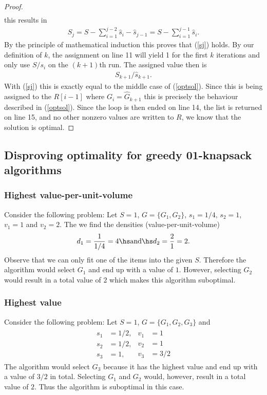 \documentclass{article}
\begin{document}
\begin{proof}
\begin{align*}
	\end{align*}
	this results in
	\begin{align*}
		S_j = S - \sum_{i=1}^{j-2} \hat s_i - \hat s_{j-1} = S - \sum_{i=1}^{j-1} \hat s_i.
	\end{align*}
	By the principle of mathematical induction this proves that (\ref{sj}) holds.
	By our definition of $k$, the assignment on line 11 will yield 1 for the first $k$
	iterations and only use $S/s_i$ on the $(k+1)$th run. The assigned value then is
	\begin{align*}
		S_{k+1}/\hat s_{k+1}.
	\end{align*}
	With (\ref{sj}) this is exactly equal to the middle case of (\ref{optsol}).
	Since this is being assigned to the $R[i-1]$ where $G_i = \hat G_{k+1}$ this
	is precisely the behaviour described in (\ref{optsol}).
	Since the loop is then ended on line 14, the list is returned on line 15,
	and no other nonzero values are written to $R$,
	we know that the solution is optimal.
\end{proof}

\subsection{Disproving optimality for greedy 01-knapsack algorithms}

\subsubsection{Highest value-per-unit-volume}

Consider the following problem: Let $S=1$, $G=\{G_1, G_2\}$, $s_1=1/4$, $s_2=1$,
$v_1=1$ and $v_2=2$. The we find the densities (value-per-unit-volume)
\begin{align*}
	d_1 = \frac{1}{1/4} = 4 \hs\text{and}\hs d_2 =\frac{2}{1}=2.
\end{align*}
Observe that we can only fit one of the items into the given $S$.
Therefore the algorithm would select $G_1$ and end up with a value of $1$.
However, selecting $G_2$ would result in a total value of $2$ which makes
this algorithm suboptimal.

\subsubsection{Highest value}

Consider the following problem: Let $S=1$, $G=\{G_1, G_2, G_3\}$ and
\begin{align*}
	\begin{split}
		s_1&=1/2,\\
		s_2&=1/2,\\
		s_3&=1,
	\end{split}
	\begin{split}
		v_1 &= 1\\
		v_2 &= 1\\
		v_3 &= 3/2
	\end{split}
\end{align*}
The algorithm would select $G_3$ because it has the highest value
and end up with a value of $3/2$ in total. Selecting $G_1$ and
$G_2$ would, however, result in a total value of $2$. Thus the
algorithm is suboptimal in this case.
\end{document}
